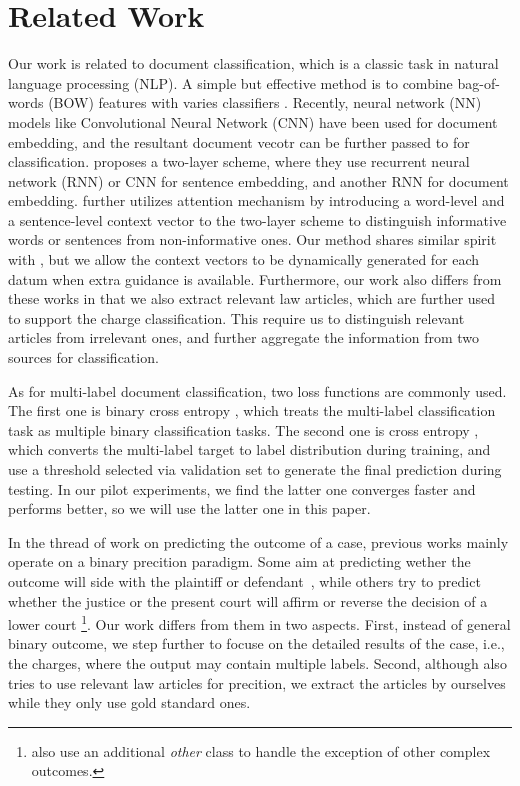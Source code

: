 \section{Related Work}
\label{sec_related_work}
Our work is related to document classification, which is a classic task in natural language processing (NLP). A simple but effective method is to combine bag-of-words (BOW) features with varies classifiers \cite{joachims1998text}. 
Recently, neural network (NN) models like Convolutional Neural Network (CNN) \cite{kim2014convolutional} have been used for document embedding, and the resultant document vecotr can be further passed to  for classification.
\cite{tang2015document} proposes a two-layer scheme, where they use recurrent neural network (RNN) or CNN for sentence embedding, and another RNN for document embedding. 
\cite{yang2016hierarchical} further utilizes attention mechanism by introducing a word-level and a sentence-level context vector to the two-layer scheme to distinguish informative words or sentences from non-informative ones. 
Our method shares similar spirit with \cite{yang2016hierarchical}, but we allow the context vectors to be dynamically generated for each datum when extra guidance is available.
Furthermore, our work also differs from these works in that we also extract relevant law articles, which are further used to support the charge classification. This require us to distinguish relevant articles from irrelevant ones, and further aggregate the information from two sources for classification.

As for multi-label document classification, two loss functions are commonly used. 
The first one is binary cross entropy \cite{nam2014large}, which treats the multi-label classification task as multiple binary classification tasks. 
The second one is cross entropy \cite{kurata2016improved}, which converts the multi-label target to label distribution during training, and use a threshold selected via validation set to generate the final prediction during testing. In our pilot experiments, we find the latter one converges faster and performs better, so we will use the latter one in this paper.

In the thread of work on predicting the outcome of a case, previous works mainly operate on a binary precition paradigm. 
Some aim at predicting wether the outcome will side with the plaintiff or defendant~\cite{bench1993neural,bruninghaus2003predicting,aletras2016predicting}, 
while others try to predict whether the justice or the present court will affirm or reverse the decision of a lower court \cite{martin2002dynamic,martin2004competing,lauderdale2014scaling,sim2015utility,katz2016general}\footnote{\cite{katz2016general} also use an additional \emph{other} class to handle the exception of other complex outcomes.}. 
Our work differs from them in two aspects. 
First, instead of general binary outcome, we step further to focuse on the detailed results of the case, i.e., the charges, where the output may contain multiple labels. 
Second, although \cite{aletras2016predicting} also tries to use relevant law articles for precition, we extract the articles by ourselves while they only use gold standard ones.

